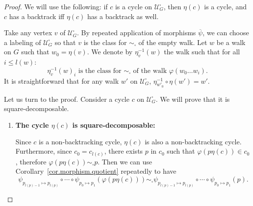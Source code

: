 \documentclass{article}
\newcommand\quadcover[1]{\mathcal{U}^\square_{#1}}
\begin{document}
\begin{proof}
We will use the following: if $c$ is a cycle on $\quadcover{G}$, then $\eta(c)$ is a cycle, and $c$ has a backtrack iff $\eta(c)$ has a backtrack as well.


Take any vertex $v$ of $\quadcover{G}$. By repeated application of morphisms $\overline{\psi}$, we can choose a labeling of $\quadcover{G}$ so that $v$ is the class for $\sim_\square$ of the empty walk.
Let $w$ be a walk on $G$ such that $w_0 = \eta(v)$. We denote by $\eta^{-1}_v(w)$ the walk such that for all $i \le l(w)$:
\[\eta^{-1}_v(w)_i\text{ is the class for }\sim_\square\text{ of the walk } \varphi(w_0\dots w_i).\]
It is straightforward that for any walk $w'$ on $\quadcover{G}$, $\eta^{-1}_{w'_0}\circ\eta(w') = w'$.



Let us turn to the proof. Consider a cycle $c$ on $\quadcover{G}$. We will prove that it is square-decomposable.
\begin{enumerate}
\item \textbf{The cycle $\eta(c)$ is square-decomposable:}

Since $c$ is a non-backtracking cycle, $\eta(c)$ is also a non-backtracking cycle. 
Furthermore, since $c_0 = c_{l(c)}$, there exists $p$ in $c_0$ such that $\varphi(p \eta(c)) \in c_0$, therefore 
$\varphi(p \eta(c)) \sim_{\square} p$.
Then we can use Corollary~\ref{cor.morphism.quotient} repeatedly to have 
\[\psi_{p_{l(p)-1} \mapsto p_{l(p)}} \circ \cdots \circ \psi_{p_0 \mapsto p_1} (\varphi(p \eta(c))) \sim_{\square} \psi_{p_{l(p)-1} \mapsto p_{l(p)}} \circ \cdots \circ \psi_{p_0 \mapsto p_1} (p).\]


\end{enumerate}
\end{proof}
\end{document}
